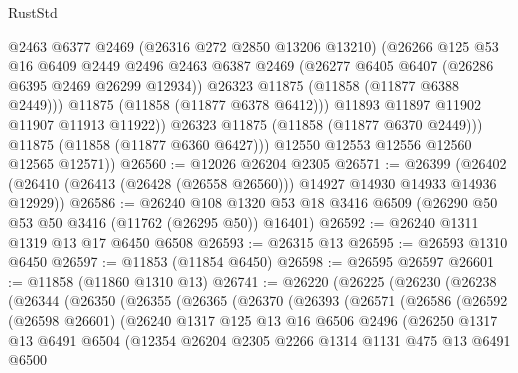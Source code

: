 \begin{lexlean}{RustStd}
\begin{coremodule}
                  @2463
                  @6377
                  @2469
                  (@26316 @272 @2850 @13206 @13210)
                  (@26266
                    @125
                    @53
                    @16
                    @6409
                    @2449
                    @2496
                    @2463
                    @6387
                    @2469
                    (@26277 @6405 @6407 (@26286 @6395 @2469 @26299 @12934))
                    @26323
                    @11875
                    (@11858 (@11877 @6388 @2449)))
                  @11875
                  (@11858 (@11877 @6378 @6412)))
                @11893
                @11897
                @11902
                @11907
                @11913
                @11922))
            @26323
            @11875
            (@11858 (@11877 @6370 @2449)))
          @11875
          (@11858 (@11877 @6360 @6427)))
        @12550
        @12553
        @12556
        @12560
        @12565
        @12571))
@26560 := @12026 @26204 @2305
@26571 := @26399
    (@26402 (@26410 (@26413 (@26428 (@26558 @26560))) @14927 @14930 @14933 @14936 @12929))
@26586 := @26240
    @108
    @1320
    @53
    @18
    @3416
    @6509
    (@26290 @50 @53 @50 @3416 (@11762 (@26295 @50)) @16401)
@26592 := @26240 @1311 @1319 @13 @17 @6450 @6508
@26593 := @26315 @13
@26595 := @26593 @1310 @6450
@26597 := @11853 (@11854 @6450)
@26598 := @26595 @26597
@26601 := @11858 (@11860 @1310 @13)
@26741 := @26220
    (@26225
      (@26230
        (@26238
          (@26344
            (@26350
              (@26355
                (@26365
                  (@26370
                    (@26393
                      (@26571
                        (@26586
                          (@26592
                            (@26598 @26601)
                            (@26240
                              @1317
                              @125
                              @13
                              @16
                              @6506
                              @2496
                              (@26250
                                @1317
                                @13
                                @6491
                                @6504
                                (@12354
                                  @26204
                                  @2305
                                  @2266
                                  @1314
                                  @1131
                                  @475
                                  @13
                                  @6491
                                  @6500

\end{coremodule}
\end{lexlean}
